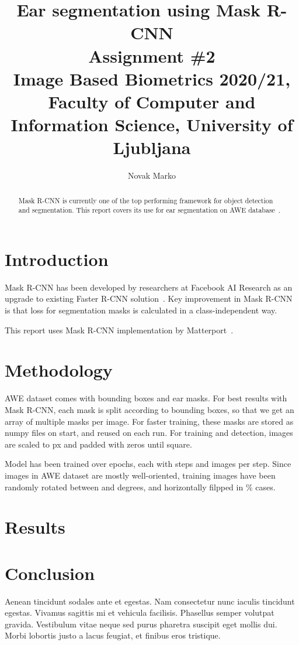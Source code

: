 \documentclass[9pt]{IEEEtran}
\title{\vspace{0ex} %
Ear segmentation using Mask R-CNN
\\ \large{Assignment \#2}\\ \normalsize{Image Based Biometrics 2020/21, Faculty of Computer and Information Science, University of Ljubljana}}
\author{ %
Novak Marko
\vspace{-4.0ex}
}
\begin{document}
\maketitle

\begin{abstract}
Mask R-CNN is currently one of the top performing framework for object detection and segmentation. This report covers its use for ear segmentation on AWE database~\cite{DBLP:journals/corr/EmersicSP16}.
\end{abstract}

\section{Introduction}
Mask R-CNN has been developed by researchers at Facebook AI Research as an upgrade to existing Faster R-CNN solution~\cite{DBLP:journals/corr/HeGDG17}. Key improvement in Mask R-CNN is that loss for segmentation masks is calculated in a class-independent way.

This report uses Mask R-CNN implementation by Matterport~\cite{matterport_maskrcnn_2017}.

\section{Methodology}
AWE dataset comes with bounding boxes and ear masks. For best results with Mask R-CNN, each mask is split according to bounding boxes, so that we get an array of multiple masks per image. For faster training, these masks are stored as numpy files on start, and reused on each run. For training and detection, images are scaled to px and padded with zeros until square.

Model has been trained over  epochs, each with  steps and  images per step. Since images in AWE dataset are mostly well-oriented, training images have been randomly rotated between  and  degrees, and horizontally filpped in \% cases.

\section{Results}

\section{Conclusion}

Aenean tincidunt sodales ante et egestas. Nam consectetur nunc iaculis tincidunt egestas. Vivamus sagittis mi et vehicula facilisis. Phasellus semper volutpat gravida. Vestibulum vitae neque sed purus pharetra suscipit eget mollis dui. Morbi lobortis justo a lacus feugiat, et finibus eros tristique.



\end{document}
